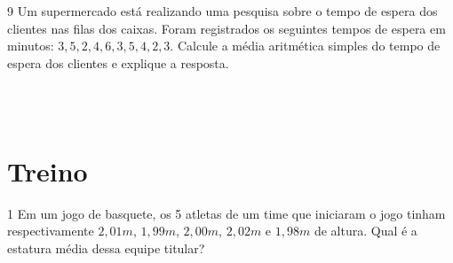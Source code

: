 {{\\
\\













\pagebreak

\num{9} Um supermercado está realizando uma pesquisa sobre o tempo de espera
dos clientes nas filas dos caixas. Foram registrados os seguintes tempos
de espera em minutos: $3, 5, 2, 4, 6, 3, 5, 4, 2, 3$.
Calcule a média aritmética simples do tempo de espera dos clientes e
explique a resposta.

\\
\\

\section*{Treino}

\num{1} Em um jogo de basquete, os 5 atletas de um time que iniciaram o jogo
tinham respectivamente $2,01 m$, $1,99 m$, $2,00 m$, $2,02 m$ e $1,98 m$ de
altura. Qual é a estatura média dessa equipe titular?

}}
